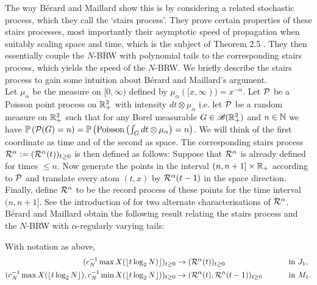 The way Bérard and Maillard show this is by considering a related stochastic process, which they call the `stairs process'. They prove certain properties of these stairs processes, most importantly their asymptotic speed of propagation when suitably scaling space and time, which is the subject of Theorem 2.5 \cite{poly_tails}. They then essentially couple the $N$-BRW with polynomial tails to the corresponding stairs process, which yields the speed of the $N$-BRW. We briefly describe the stairs process to gain some intuition about Bérard and Maillard's argument. \\


Let $\mu_\alpha$ be the measure on $[0, \infty)$ defined by $\mu_\alpha([x, \infty)) = x^{-\alpha}$. Let $\cal{P}$ be a Poisson point process on $\R_+^2$ with intensity $dt \otimes \mu_\alpha$ i.e. let $\cal{P}$ be a random measure on $\R_+^2$ such that for any Borel measurable $G \in \scr{B}(\R_+^2)$ and $n \in \N$ we have $\Pr{\cal{P}(G) = n} = \Pr{\dPo{\int_G dt \otimes \mu_\alpha} = n}$. We will think of the first coordinate as time and of the second as space. The corresponding stairs process $\cal{R}^\alpha \defeq (\cal{R}^\alpha (t))_{t \geq 0}$ is then defined as follows: Suppose that $\cal{R}^\alpha$ is already defined for times $ \leq n$. Now generate the points in the interval $(n, n+1] \times \R_+$ according to $\cal{P}$ and translate every atom $(t,x)$ by $\cal{R}^\alpha (t-1)$ in the space direction. Finally, define $\cal{R}^\alpha$ to be the record process of these points for the time interval $(n, n+1]$. See the introduction of \cite{poly_tails} for two alternate characterisations of $\cal{R}^\alpha$. Bérard and Maillard obtain the following result relating the stairs process and the $N$-BRW with $\alpha$-regularly varying tails:

\begin{theorem}
With notation as above, 
\begin{align*}
(c_N^{-1} \max X(\floor{t \log_2 N)})_{t \geq 0} &\rightarrow (\cal{R}^\alpha (t))_{t \geq 0} \qquad&&\text{ in } J_1, \\ 	
(c_N^{-1} \max X(\floor{t \log_2 N}), c_N^{-1} \min X(\floor{t \log_2 N}))_{t \geq 0} &\rightarrow (\cal{R}^\alpha (t), \cal{R}^\alpha (t - 1))_{t \geq 0} \qquad&&\text{ in } M_1. 
\end{align*}
\end{theorem}
